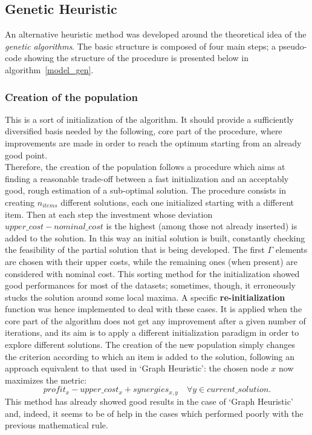 \documentclass{article}
\begin{document}
\subsection{Genetic Heuristic}
An alternative heuristic method was developed around the theoretical idea of the \emph{genetic algorithms}. The basic structure is composed of four main steps; a pseudo-code showing the structure of the procedure is presented below in algorithm~\ref{model_gen}.

\subsubsection{Creation of the population}
This is a sort of initialization of the algorithm. It should provide a sufficiently diversified basis needed by the following, core part of the procedure, where improvements are made in order to reach the optimum starting from an already good point.\\

Therefore, the creation of the population follows a procedure which aims at finding a reasonable trade-off between a fast initialization and an acceptably good, rough estimation of a sub-optimal solution. The procedure consists in creating $n_{items}$ different solutions, each one initialized starting with a different item. Then at each step the investment whose deviation $upper\_cost-nominal\_cost$ is the highest (among those not already inserted) is added to the solution. In this way an initial solution is built, constantly checking the feasibility of the partial solution that is being developed. The first $\Gamma$ elements are chosen with their upper costs, while the remaining ones (when present) are considered with nominal cost. This sorting method for the initialization showed good performances for most of the datasets; sometimes, though, it erroneously stucks the solution around some local maxima. A specific \textbf{re-initialization} function was hence implemented to deal with these cases. It is applied when the core part of the algorithm does not get any improvement after a given number of iterations, and its aim is to apply a different initialization paradigm in order to explore different solutions. The creation of the new population simply changes the criterion according to which an item is added to the solution, following an approach equivalent to that used in `Graph Heuristic': the chosen node $x$ now maximizes the metric:
\begin{equation*}
    profit_x-upper\_cost_x+synergies_{x,y}\quad \forall y\in current\_solution.
\end{equation*}
This method has already showed good results in the case of `Graph Heuristic' and, indeed, it seems to be of help in the cases which performed poorly with the previous mathematical rule.
\end{document}
